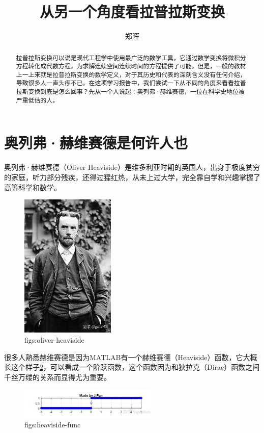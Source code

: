 \documentclass[lang=cn,11pt,a4paper,cite=numbers]{elegantpaper}
\title{从另一个角度看拉普拉斯变换}
\author{郑晖}
\date{\zhtoday}
\begin{document}
\maketitle

\begin{abstract}
拉普拉斯变换可以说是现代工程学中使用最广泛的数学工具，它通过数学变换将微积分方程转化成代数方程，为求解连续空间连续时间的方程提供了可能。但是，一般的教材上一上来就是拉普拉斯变换的数学定义，对于其历史和代表的深刻含义没有任何介绍，导致很多人一直头疼不已。在这项学习报告中，我们尝试一下从不同的角度来看看拉普拉斯变换到底是怎么回事？先从一个人说起：奥列弗·赫维赛德，一位在科学史地位被严重低估的人。
\end{abstract}

\section{奥列弗·赫维赛德是何许人也}
  奥列弗·赫维赛德（Oliver Heaviside）是维多利亚时期的英国人，出身于极度贫穷的家庭，听力部分残疾，还得过猩红热，从未上过大学，完全靠自学和兴趣掌握了高等科学和数学。
\begin{figure}[!htb]
  \centering
  \includegraphics[width=0.4\textwidth]{figs/oliver-heaviside.png}
  \caption{figs:oliver-heaviside}
  \label{figs:oliver-heaviside}
\end{figure}

  很多人熟悉赫维赛德是因为MATLAB有一个赫维赛德（Heaviside）函数，它大概长这个样子\ref{figs:heaviside-func}，可以看成一个阶跃函数，这个函数因为和狄拉克（Dirac）函数之间千丝万缕的关系而显得尤为重要。
\begin{figure}[!htb]
  \centering
  \includegraphics[width=0.6\textwidth]{figs/heaviside-func.png}
  \caption{figs:heaviside-func}
  \label{figs:heaviside-func}
\end{figure}
\end{document}
